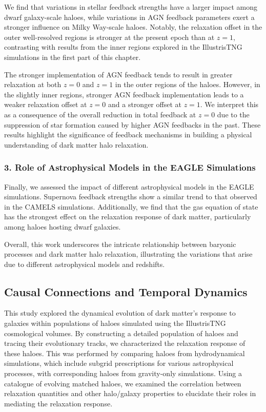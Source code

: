 We find that variations in stellar feedback strengths have a larger impact among dwarf galaxy-scale haloes, while variations in AGN feedback parameters exert a stronger influence on Milky Way-scale haloes. Notably, the relaxation offset in the outer well-resolved regions is stronger at the present epoch than at \( z=1 \), contrasting with results from the inner regions explored in the IllustrisTNG simulations in the first part of this chapter.

The stronger implementation of AGN feedback tends to result in greater relaxation at both \( z=0 \) and \( z=1 \) in the outer regions of the haloes. However, in the slightly inner regions, stronger AGN feedback implementation leads to a weaker relaxation offset at \( z=0 \) and a stronger offset at \( z=1 \). We interpret this as a consequence of the overall reduction in total feedback at \( z=0 \) due to the suppression of star formation caused by higher AGN feedbacks in the past. These results highlight the significance of feedback mechanisms in building a physical understanding of dark matter halo relaxation.

\subsubsection*{3. Role of Astrophysical Models in the EAGLE Simulations}
Finally, we assessed the impact of different astrophysical models in the EAGLE simulations. Supernova feedback strengths show a similar trend to that observed in the CAMELS simulations. Additionally, we find that the gas equation of state has the strongest effect on the relaxation response of dark matter, particularly among haloes hosting dwarf galaxies.

Overall, this work underscores the intricate relationship between baryonic processes and dark matter halo relaxation, illustrating the variations that arise due to different astrophysical models and redshifts.

\subsection*{Causal Connections and Temporal Dynamics}
This study explored the dynamical evolution of dark matter's response to galaxies within populations of haloes simulated using the IllustrisTNG cosmological volumes. By constructing a detailed population of haloes and tracing their evolutionary tracks, we characterized the relaxation response of these haloes. This was performed by comparing haloes from hydrodynamical simulations, which include subgrid prescriptions for various astrophysical processes, with corresponding haloes from gravity-only simulations. Using a catalogue of evolving matched haloes, we examined the correlation between relaxation quantities and other halo/galaxy properties to elucidate their roles in mediating the relaxation response.

